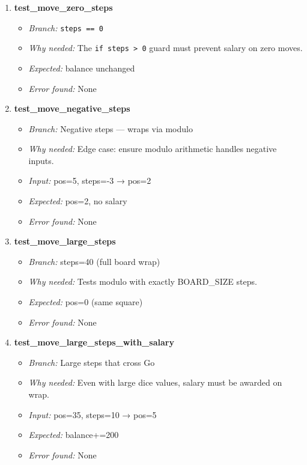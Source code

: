 \documentclass{article}
\begin{document}
\begin{enumerate}[resume, label=\textbf{TC\arabic*.}]
  \item \textbf{test\_move\_zero\_steps}
  \begin{itemize}[noitemsep]
    \item \textit{Branch:} \texttt{steps == 0}
    \item \textit{Why needed:} The \texttt{if steps > 0} guard must prevent salary on zero moves.
    \item \textit{Expected:} balance unchanged
    \item \textit{Error found:} None
  \end{itemize}

  \item \textbf{test\_move\_negative\_steps}
  \begin{itemize}[noitemsep]
    \item \textit{Branch:} Negative steps — wraps via modulo
    \item \textit{Why needed:} Edge case: ensure modulo arithmetic handles negative inputs.
    \item \textit{Input:} pos=5, steps=-3 → pos=2
    \item \textit{Expected:} pos=2, no salary
    \item \textit{Error found:} None
  \end{itemize}

  \item \textbf{test\_move\_large\_steps}
  \begin{itemize}[noitemsep]
    \item \textit{Branch:} steps=40 (full board wrap)
    \item \textit{Why needed:} Tests modulo with exactly BOARD\_SIZE steps.
    \item \textit{Expected:} pos=0 (same square)
    \item \textit{Error found:} None
  \end{itemize}

  \item \textbf{test\_move\_large\_steps\_with\_salary}
  \begin{itemize}[noitemsep]
    \item \textit{Branch:} Large steps that cross Go
    \item \textit{Why needed:} Even with large dice values, salary must be awarded on wrap.
    \item \textit{Input:} pos=35, steps=10 → pos=5
    \item \textit{Expected:} balance+=200
    \item \textit{Error found:} None
  \end{itemize}


\end{enumerate}
\end{document}
